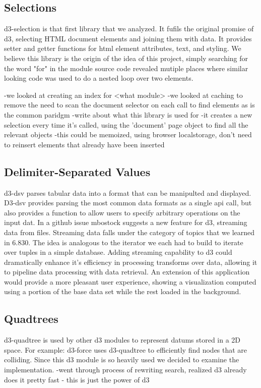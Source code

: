 \documentclass[a4paper]{article}
\begin{document}
\subsection{Selections}
d3-selection is that first library that we analyzed. It fufils the original promise of d3, selecting HTML document elements and joining them with data. It provides setter and getter functions for html element attributes, text, and styling. We believe this library is the origin of the idea of this project, simply searching for the word "for" in the module source code revealed mutiple places where similar looking code was used to do a nested loop over two elements.


-we looked at creating an index for <what module>
-we looked at caching to remove the need to scan the document selector on each call to find elements as is the common paridgm
-write about what this library is used for
-it creates a new selection every time it's called, using the 'document' page object to find all the relevant objects
-this could be memoized, using browser localstorage, don't need to reinsert elements that already have been inserted

\subsection{Delimiter-Separated Values}
d3-dsv parses tabular data into a format that can be manipulted and displayed. D3-dsv provides parsing the most common data formats as a single api call, but also provides a function to allow users to specify arbitrary operations on the input dat. In a github issue mbostock suggests a new feature for d3, streaming data \cite{dsvstream} from files. Streaming data falls under the category of topics that we learned in 6.830. The idea is analogous to the iterator we each had to build to iterate over tuples in a simple database. Adding streaming capability to d3 could dramatically enhance it's efficiency in processing transforms over data, allowing it to pipeline data processing with data retrieval. An extension of this application would provide a more pleasant user experience, showing a visualization computed using a portion of the base data set while the rest loaded in the background.

\subsection{Quadtrees}
d3-quadtree is used by other d3 modules to represent datums stored in a 2D space. For example: d3-force uses d3-quadtree to efficiently find nodes that are colliding. Since this d3 module is so heavily used we decided to examine the implementation.
-went through process of rewriting search, realized d3 already does it pretty fast
- this is just the power of d3
\end{document}
